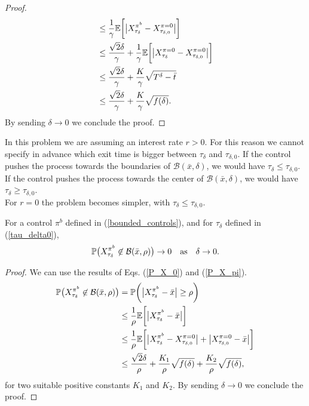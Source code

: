 \begin{proof}
\begin{align}
      & \leq \frac{1}{\gamma} \mathbb{E} \biggl[ \big| X^{\pi^b}_{\tau_{\delta}} - X^{\pi = 0}_{\tau_{\delta,0}} \big| \biggr] \\ \nonumber
      & \leq \frac{\sqrt{2}\delta}{\gamma} + \frac{1}{\gamma} \mathbb{E} \biggl[ \big| X^{\pi = 0}_{\tau_{\delta}} - X^{\pi = 0}_{\tau_{\delta,0}} \big| \biggr] \\ \nonumber
      & \leq \frac{\sqrt{2}\delta}{\gamma} + \frac{K}{\gamma} \sqrt{T^{\delta} - \bar t} \\ \nonumber
      & \leq \frac{\sqrt{2}\delta}{\gamma} + \frac{K}{\gamma} \sqrt{f(\delta)}.
\end{align}
By sending $\delta \to 0$ we conclude the proof.
\end{proof}

\begin{Remark}
 In this problem we are assuming an interest rate $r>0$. For this reason we cannot specify in advance which exit time is bigger between $\tau_{\delta}$ and 
 $\tau_{\delta,0}$. If the control pushes the process towards the boundaries of $\mathcal{B}(\bar x, \delta)$, 
 we would have $\tau_{\delta} \leq \tau_{\delta,0}$. If the control 
 pushes the process towards the center of $\mathcal{B}(\bar x, \delta)$, we would have $\tau_{\delta} \geq \tau_{\delta,0}$.\\
 For $r=0$ the problem becomes simpler, with $\tau_{\delta} \leq \tau_{\delta,0}$.
\end{Remark}

\begin{Lemma}\label{Corollary_P_exit}
For a control $\pi^b$ defined in (\ref{bounded_controls}), and for $\tau_{\delta}$ defined in (\ref{tau_delta0}),
 $$ \mathbb{P} \bigl( X^{\pi^b}_{\tau_{\delta}} \not \in \mathcal{B}(\bar x, \rho) \bigr) \to 0 \quad \mbox{as} \quad \delta \to 0 .$$ 
\end{Lemma}

\begin{proof}
We can use the results of Eqs. (\ref{P_X_0}) and (\ref{P_X_pi}).
\begin{align}
 \mathbb{P} \bigl( X^{\pi^b}_{\tau_{\delta}} \not \in \mathcal{B}(\bar x, \rho) \bigr) &= \mathbb{P} \biggl( \bigl| X^{\pi^b}_{\tau_{\delta}} - \bar x \bigr| \geq \rho \biggr) \\ \nonumber
      & \leq \frac{1}{\rho} \mathbb{E} \biggl[ \big| X^{\pi^b}_{\tau_{\delta}} - \bar x \big| \biggr] \\ \nonumber
      & \leq \frac{1}{\rho} \mathbb{E} \biggl[ \big| X^{\pi^b}_{\tau_{\delta}} - X^{\pi = 0}_{\tau_{\delta,0}} \big| + \big| X^{\pi = 0}_{\tau_{\delta,0}} - \bar x \big| \biggr] \\ \nonumber
      & \leq \frac{\sqrt{2}\delta}{\rho} + \frac{K_1}{\rho} \sqrt{f(\delta)} + \frac{K_2}{\rho}\sqrt{f(\delta)},
\end{align}  
for two suitable positive constants $K_1$ and $K_2$.
By sending $\delta \to 0$ we conclude the proof.
\end{proof}



